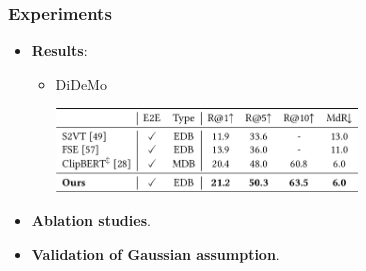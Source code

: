 \documentclass[notes, 10pt, aspectratio=169]{beamer}
\begin{document}
\begin{frame}
    \frametitle{Experiments}
    \begin{itemize}
        \item \textbf{Results}:
    \begin{itemize}
        \item DiDeMo
            \begin{center}
                \includegraphics[width=8cm]{didemo.png}
            \end{center}
    \end{itemize}
\item \textbf{Ablation studies}.
\item \textbf{Validation of Gaussian assumption}.
    \end{itemize}
\end{frame}
\end{document}
